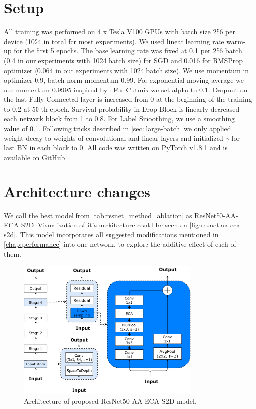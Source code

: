 \section{Setup}
All training was performed on 4 x Tesla V100 GPUs with batch size 256 per device (1024 in total for most experiments). We used linear learning rate warm-up for the first 5 epochs. The base learning rate was fixed at 0.1 per 256 batch (0.4 in our experiments with 1024 batch size) for SGD and 0.016 for RMSProp optimizer (0.064 in our experiments with 1024 batch size). We use momentum in optimizer 0.9, batch norm momentum 0.99. For exponential moving average we use momentum 0.9995 inspired by \cite{tan2021_efficientnetv2}. For Cutmix we set alpha to 0.1. Dropout on the last Fully Connected layer is increased from 0 at the beginning of the training to 0.2 at 50-th epoch. Survival probability in Drop Block is linearly decreased each network block from 1 to 0.8. For Label Smoothing, we use a smoothing value of 0.1. Following tricks described in \autoref{sec: large-batch} we only applied weight decay to weights of convolutional and linear layers and initialized $\gamma$ for last BN in each block to 0. All code was written on PyTorch v1.8.1 and is available on \href{https://github.com/bonlime/sota_imagenet/}{GitHub}

\section{Architecture changes}
We call the best model from \autoref{tab:resnet_method_ablation} as ResNet50-AA-ECA-S2D. Visualization of it's architecture could be seen on \autoref{fig:resnet-aa-eca-s2d}. This model incorporates all suggested modifications mentioned in \autoref{chap:performance} into one network, to explore the additive effect of each of them.   


\begin{figure}[h!]
    \centering
    \includegraphics[width=0.8\textwidth]{images/full_network.pdf}
    \caption{Architecture of proposed ResNet50-AA-ECA-S2D model.}
    \label{fig:resnet-aa-eca-s2d}
  \end{figure}


